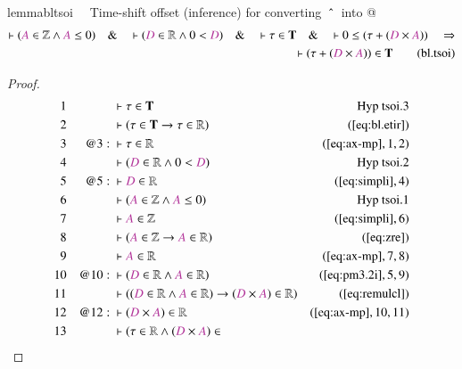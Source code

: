 \begin{restatable}{lemma}{bltsoi}~~ Time-shift offset (inference) for
converting $~\string^~$ into @
\begin{align}
\vdash ( \mc{A} \in \mathbb{Z} \wedge \mc{A} \le 0 )\quad\&\quad \vdash (
    \mc{D} \in \mathbb{R} \wedge 0 < \mc{D} )\quad\&\quad \vdash \tau \in
    \mathbf{T}\quad\&\quad \vdash 0 \le ( \tau + ( \mc{D} \times \mc{A} )
    )\quad\Rightarrow \notag \\ %
      \quad \vdash ( \tau + ( \mc{D} \times \mc{A} ) ) \in
    \mathbf{T}\label{eq:bl.tsoi}\tag{bl.tsoi}
\end{align}
\end{restatable}

\begin{proof}
\begin{align}
  1 &&  & \vdash \tau \in \mathbf{T}&\text{Hyp~tsoi.3}\notag%
  \\ 2 &&  & \vdash ( \tau \in \mathbf{T} \rightarrow \tau \in \mathbb{R}
      )&(\mbox{\ref{eq:bl.etir}})\notag
  \\ 3 && @3:\  & \vdash \tau \in \mathbb{R}&(\mbox{\ref{eq:ax-mp}},1,2)\notag
  \\ 4 &&  & \vdash ( \mc{D} \in \mathbb{R} \wedge 0 < \mc{D}
      )&\text{Hyp~tsoi.2}\notag%
  \\ 5 && @5:\  & \vdash \mc{D} \in \mathbb{R}&(\mbox{\ref{eq:simpli}},4)\notag
  \\ 6 &&  & \vdash ( \mc{A} \in \mathbb{Z} \wedge \mc{A} \le 0
      )&\text{Hyp~tsoi.1}\notag%
  \\ 7 &&  & \vdash \mc{A} \in \mathbb{Z}&(\mbox{\ref{eq:simpli}},6)\notag
  \\ 8 &&  & \vdash ( \mc{A} \in \mathbb{Z} \rightarrow \mc{A} \in \mathbb{R}
      )&(\mbox{\ref{eq:zre}})\notag
  \\ 9 &&  & \vdash \mc{A} \in \mathbb{R}&(\mbox{\ref{eq:ax-mp}},7,8)\notag
  \\ 10 && @10:\  & \vdash ( \mc{D} \in \mathbb{R} \wedge \mc{A} \in \mathbb{R}
      )&(\mbox{\ref{eq:pm3.2i}},5,9)\notag
  \\ 11 &&  & \vdash ( ( \mc{D} \in \mathbb{R} \wedge \mc{A} \in \mathbb{R} )
      \rightarrow ( \mc{D} \times \mc{A} ) \in \mathbb{R}
      )&(\mbox{\ref{eq:remulcl}})\notag
  \\ 12 && @12:\  & \vdash ( \mc{D} \times \mc{A} ) \in
      \mathbb{R}&(\mbox{\ref{eq:ax-mp}},10,11)\notag
  \\ 13 &&  & \vdash ( \tau \in \mathbb{R} \wedge ( \mc{D} \times \mc{A} ) \in

\end{align}
\end{proof}
